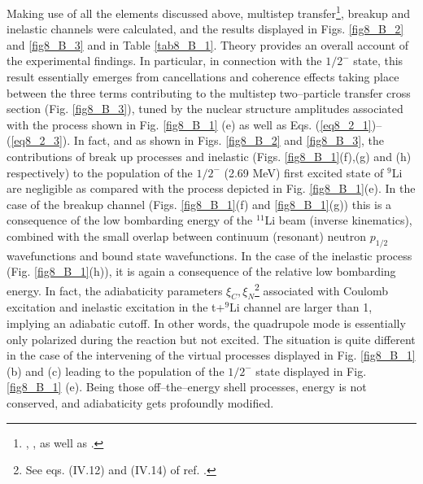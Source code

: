 \begin{subappendices}
 Making use of all the elements discussed above, multistep transfer\footnote{\cite{Bayman:82}, \cite{Igarashi:91},  \cite{Bayman:73} as well as \cite{Broglia:04a}.}, breakup and inelastic channels were calculated, and the results displayed in Figs. \ref{fig8_B_2} and \ref{fig8_B_3} and in Table \ref{tab8_B_1}. Theory provides an overall account of the experimental findings. In particular, in connection with the $1/2^-$ state, this result essentially emerges from cancellations and coherence effects taking place between the three terms contributing to the multistep two--particle transfer cross section (Fig. \ref{fig8_B_3}), tuned by the nuclear structure amplitudes associated with the process shown in Fig. \ref{fig8_B_1} (e) as well as Eqs. (\ref{eq8_2_1})--(\ref{eq8_2_3}). In fact, and
as shown in Figs. \ref{fig8_B_2} and \ref{fig8_B_3}, the contributions of break up processes and inelastic   (Figs. \ref{fig8_B_1}(f),(g) and (h) respectively) to the population of the $1/2^-$ (2.69 MeV) first excited state of $^9$Li are negligible as compared with the process depicted in Fig. \ref{fig8_B_1}(e). In the case of the breakup channel (Figs. \ref{fig8_B_1}(f) and \ref{fig8_B_1}(g)) this is a consequence of the low bombarding energy of the $^{11}$Li beam (inverse kinematics), combined with the small overlap between continuum (resonant) neutron $p_{1/2}$ wavefunctions and  bound state wavefunctions. In the case of the inelastic process (Fig. \ref{fig8_B_1}(h)), it is again a consequence of the relative low bombarding energy. In fact, the adiabaticity parameters $\xi_C,\xi_N$\footnote{See eqs. (IV.12) and (IV.14) of ref. \cite{Broglia:04a}.} associated with Coulomb excitation and inelastic excitation in the t+$^9$Li channel are larger than 1, implying an adiabatic cutoff. In other words, the quadrupole mode is essentially only polarized during the reaction but not excited. The situation is quite different in the case of the intervening of the virtual processes  displayed in Fig. \ref{fig8_B_1} (b) and (c) leading to the population of the $1/2^-$ state displayed in Fig. \ref{fig8_B_1} (e). Being those off--the--energy shell processes, energy is not conserved, and adiabaticity gets profoundly modified.


\end{subappendices}
